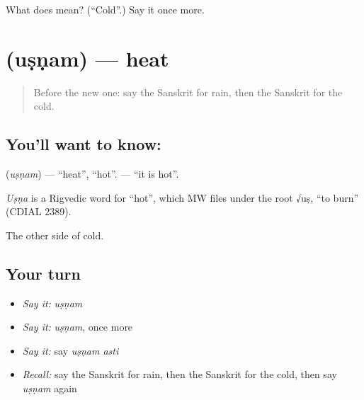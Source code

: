 \begin{tcolorbox}[breakable,colback=teal!4,colframe=teal!35!black,title={Before you move on}]
What does  mean? (\textquotedblleft{}Cold\textquotedblright{}.) Say it once more.
\end{tcolorbox}
\section[\texorpdfstring{\sk{उष्णम्} (uṣṇam)}{उष्णम् (uṣṇam)}]{ (uṣṇam) — heat}

\label{lesson:SA-C76-heat}



\begin{quote}
Before the new one: say the Sanskrit for rain, then the Sanskrit for the cold.
\end{quote}

\subsection*{You'll want to know: }
\textbf{} (\emph{uṣṇam}) — \textquotedblleft{}heat\textquotedblright{}, \textquotedblleft{}hot\textquotedblright{}. \textbf{ } — \textquotedblleft{}it is hot\textquotedblright{}.

\begin{cousinweb}
\emph{Uṣṇa} is a Rigvedic word for \textquotedblleft{}hot\textquotedblright{}, which MW files under the root √uṣ, \textquotedblleft{}to burn\textquotedblright{} (CDIAL 2389).
\end{cousinweb}

\begin{grammarlens}[title={What you've built}]
The other side of cold.
\end{grammarlens}

\subsection*{Your turn}
\begin{itemize}
\raggedright
  \item \emph{Say it:} \emph{uṣṇam}
  \item \emph{Say it:} \emph{uṣṇam}, once more
  \item \emph{Say it:} say \emph{uṣṇam asti}
  \item \emph{Recall:} say the Sanskrit for rain, then the Sanskrit for the cold, then say \emph{uṣṇam} again
\end{itemize}


